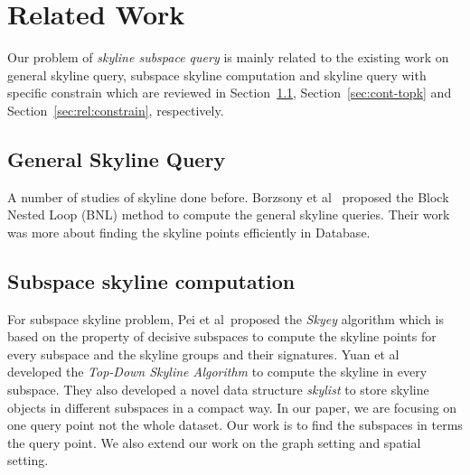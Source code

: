 
%
%

\chapter{Related Work}
\label{ch:related-work}

Our problem of \emph{skyline subspace query} is mainly related to the existing work on general skyline query, subspace skyline computation and skyline query with specific constrain which are reviewed in Section~\ref{sec:rel:general}, Section~\ref{sec:cont-topk} and Section~\ref{sec:rel:constrain}, respectively.

\section{General Skyline Query}
\label{sec:rel:general}

A number of studies of skyline done before. Borzsony et al~\cite{borzsony2001skyline} proposed the Block Nested Loop (BNL) method to compute the general skyline queries. Their work was more about finding the skyline points efficiently in Database.

\section{Subspace skyline computation}
\label{sec:rel:subspace}

For subspace skyline problem, Pei et al~\cite{pei2005catching}proposed the \emph{Skyey} algorithm which is based on the property of decisive subspaces to compute the skyline points for every subspace and the skyline groups and their signatures. Yuan et al~\cite{yuan2005efficient} developed the \emph{Top-Down Skyline Algorithm} to compute the skyline in every subspace. They also developed a novel data structure \emph{skylist} to store skyline
objects in different subspaces in a compact way. In our paper, we are focusing on one query point not the whole dataset. Our work is to find the subspaces in terms the query point. We also extend our work on the graph setting and spatial setting.

